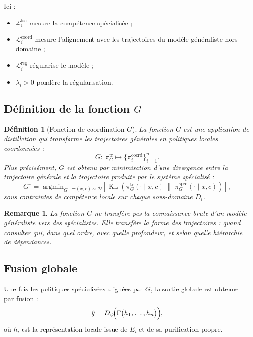 \documentclass[11pt,a4paper]{article}
\newtheorem{definition}{Définition}[section]
\newtheorem{remark}{Remarque}[section]
\DeclareMathOperator{\argmin}{argmin}
\DeclareMathOperator{\KL}{KL}
\newcommand{\1}{\mathbf 1}
\begin{document}
Ici :
\begin{itemize}[leftmargin=2em]
    \item \(\mathcal L_i^{\mathrm{loc}}\) mesure la compétence spécialisée ;
    \item \(\mathcal L_i^{\mathrm{coord}}\) mesure l'alignement avec les trajectoires du modèle généraliste hors domaine ;
    \item \(\mathcal L_i^{\mathrm{reg}}\) régularise le modèle ;
    \item \(\lambda_i>0\) pondère la régularisation.
\end{itemize}

\subsection{Définition de la fonction \(G\)}

\begin{definition}[Fonction de coordination \(G\)]
La fonction \(G\) est une application de distillation qui transforme les trajectoires générales en politiques locales coordonnées :
\[
G:\ \pi_G^{\mathrm{tr}} \longmapsto \{\pi_i^{\mathrm{coord}}\}_{i=1}^n.
\]
Plus précisément, \(G\) est obtenu par minimisation d'une divergence entre la trajectoire générale et la trajectoire produite par le système spécialisé :
\[
G^\star
=
\argmin_{G}
\;
\mathbb E_{(x,c)\sim \mathcal D}
\left[
\KL\!\left(
\pi_G^{\mathrm{tr}}(\cdot\mid x,c)
\;\middle\|\;
\pi_{G}^{\mathrm{spec}}(\cdot\mid x,c)
\right)
\right],
\]
sous contraintes de compétence locale sur chaque sous-domaine \(D_i\).
\end{definition}

\begin{remark}
La fonction \(G\) ne transfère pas la connaissance brute d'un modèle généraliste vers des spécialistes. Elle transfère la \emph{forme des trajectoires} : quand consulter qui, dans quel ordre, avec quelle profondeur, et selon quelle hiérarchie de dépendances.
\end{remark}

\subsection{Fusion globale}

Une fois les politiques spécialisées alignées par \(G\), la sortie globale est obtenue par fusion :
\[
\hat y
=
D_\psi\!\Bigl(
\Gamma\bigl(
h_1,\dots,h_n
\bigr)
\Bigr),
\]
où \(h_i\) est la représentation locale issue de \(E_i\) et de sa purification propre.
\end{document}
